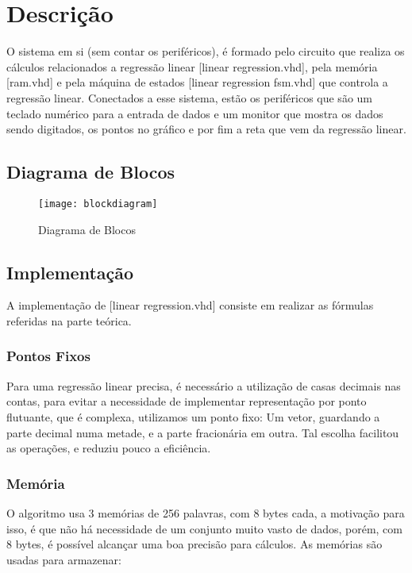 \section{Descrição}

O sistema em si (sem contar os periféricos), é formado pelo circuito que realiza os cálculos relacionados a regressão linear 
[linear regression.vhd], pela memória [ram.vhd] e pela máquina de estados [linear regression fsm.vhd] que controla a regressão linear.
Conectados a esse sistema, estão os periféricos que são um teclado numérico para a entrada de dados e um monitor 
que mostra os dados sendo digitados, os pontos no gráfico e por fim a reta que vem da regressão linear.

\subsection{Diagrama de Blocos}

    \begin{figure} [H] 
        \texttt{[image: blockdiagram]}
        \caption{Diagrama de Blocos}
        \label{fig:blockdiagram}
    \end{figure}

\subsection{Implementação}

A implementação de [linear regression.vhd] consiste em realizar as fórmulas referidas na parte teórica. 

\subsubsection{Pontos Fixos}

Para uma regressão linear precisa, é necessário a utilização de casas decimais nas contas, para evitar a 
necessidade de implementar representação por ponto flutuante, que é complexa, utilizamos um ponto fixo:
 Um vetor, guardando a parte decimal numa metade, e a parte fracionária em outra. 
Tal escolha facilitou as operações, e reduziu pouco a eficiência.

\subsubsection{Memória}

O algoritmo usa 3 memórias de 256 palavras, com 8 bytes cada, a motivação para isso, 
é que não há necessidade de um conjunto muito vasto de dados, porém, com 8 bytes, é possível alcançar uma boa precisão para cálculos.
As memórias são usadas para armazenar:

